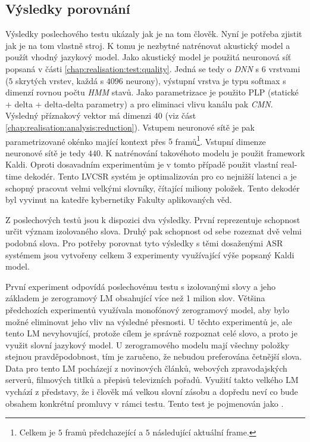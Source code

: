 \subsection{Výsledky porovnání}
\label{chap:realisation:test:comparison}

Výsledky poslechového testu ukázaly jak je na tom člověk. Nyní je potřeba zjistit jak je na tom vlastně stroj. K tomu je nezbytné natrénovat akustický model a použít vhodný jazykový model. Jako akustický model je použitá neuronová síť popsaná v části \ref{chap:realisation:test:quality}. Jedná se tedy o \textit{DNN} s $6$ vrstvami ($5$ skrytých vrstev, každá s $4096$ neurony), výstupní vrstva je typu softmax s dimenzí rovnou počtu \textit{HMM} stavů. Jako parametrizace je použito PLP (statické + delta + delta-delta parametry) a pro eliminaci vlivu kanálu pak \textit{CMN}.  Výsledný příznakový vektor má dimenzi $40$ (viz část \ref{chap:realisation:analysis:reduction}). Vstupem neuronové sítě je pak parametrizované okénko mající kontext přes $5$ framů\footnote{Celkem je $5$ framů předchazející a $5$ následující aktuální frame.}. Vstupní dimenze neuronové sítě je tedy $440$. K natrénování takovéhoto modelu je použit framework Kaldi. Oproti dosavadním experimentům je v tomto případě použit vlastní real-time dekodér. Tento LVCSR systém je optimalizován pro co nejnižší latenci a je schopný pracovat velmi velkými slovníky, čítající miliony položek. Tento dekodér byl vyvinut na katedře kybernetiky Fakulty aplikovaných věd.

Z poslechových testů jsou k dispozici dva výsledky. První reprezentuje schopnost určit význam izolovaného slova. Druhý pak schopnost od sebe rozeznat dvě velmi podobná slova. Pro potřeby porovnat tyto výsledky s těmi dosaženými ASR systémem jsou vytvořeny celkem $3$ experimenty využívající výše popsaný Kaldi model.

První experiment odpovídá poslechovému testu s izolovanými slovy a jeho základem je zerogramový LM obsahující více než 1 milion slov. Většina předchozích experimentů využívala monofónový zerogramový model, aby bylo možné eliminovat jeho vliv na výsledné přesnosti. U těchto experimentů je, ale tento LM nevyhovující, protože cílem je správně rozpoznat celé slovo, a proto je využit slovní jazykový model. U zerogramového modelu mají všechny položky stejnou pravděpodobnost, tím je zaručeno, že nebudou preferována četnější slova. Data pro tento LM pocházejí z novinových článků, webových zpravodajských serverů, filmových titlků a přepisů televizních pořadů. Využití takto velkého LM vychází z představy, že i člověk má velkou slovní zásobu a dopředu neví co bude obsahem konkrétní promluvy v rámci testu. Tento test je pojmenován jako .

